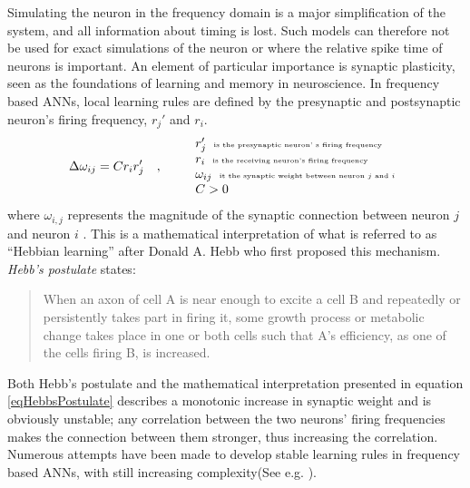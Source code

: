 	Simulating the neuron in the frequency domain is a major simplification of the system, 
		and all information about timing is lost. %
	Such models can therefore not be used for exact simulations of the neuron or where the relative spike time of neurons is important\cite{ gerstnerKistler2002, NEVR3004OmModellane}. %
	An element of particular importance is synaptic plasticity, seen as the foundations of learning and memory in neuroscience\cite{NeuroscienceExploringTheBrain3ed, PrinciplesOfNeuralScience4edKAP12, NEVR3001synPlast, NEVR3003STDP, NEVR3004OmModellane, FDP_report}.
 	In frequency based ANNs, local learning rules are defined by the presynaptic and postsynaptic neuron's firing frequency, $r_j'$ and $r_i$.
\begin{equation}
	\Delta \omega_{ij} = C r_i r_j' \quad,\qquad
	\begin{tabular}{l}
 		$r_j'$ 			\tiny{ is the presynaptic neuron' s firing frequency} \\
		$r_i$  			\tiny{ is the receiving neuron's firing frequency}  \\
		$\omega_{ij}$ 	\tiny{ it the synaptic weight between neuron $j$ and $i$} \\ %
		$C > 0$ \\
	\end{tabular}
	\label{eqHebbsPostulate}
\end{equation}
	where $\omega_{i,j}$ represents the magnitude of the synaptic connection between neuron $j$ and neuron $i$ \cite{NeuralNetworksForAppliedSciencesAndEngineering}.
 	This is a mathematical interpretation of what is referred to as ``Hebbian learning'' after Donald A. Hebb who first proposed this mechanism.
	\emph{Hebb's postulate} states:
\begin{quote}
	When an axon of cell A is near enough to excite a cell B and repeatedly or persistently takes part in firing it, some growth process or metabolic change takes place in one or both cells such that A’s efficiency, as one of the cells firing B, is increased. \cite{Hebb1949Kap4}
\end{quote}

 	Both Hebb's postulate and the mathematical interpretation presented in equation \eqref{eqHebbsPostulate} describes a monotonic increase in synaptic weight and is obviously unstable; %
 		any correlation between the two neurons' firing frequencies makes the connection between them stronger, thus increasing the correlation.
	Numerous attempts have been made to develop stable learning rules in frequency based ANNs, with still increasing complexity(See e.g. \cite{ANN_aTutorial, hebbUstabilt, Riedel1992459}). 


